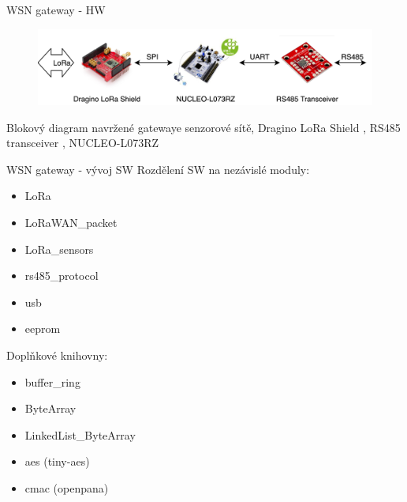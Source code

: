 \documentclass{beamer}
\begin{document}
\begin{frame} {WSN gateway - HW}
	\begin{figure}[!h]
		\centering
		\includegraphics[width=1\textwidth]{LoRaWAN_gw_RS485_blockDiagram_3}
		\label{fig:gatewayBlockDiagram}
	\end{figure}

	Blokový diagram navržené gatewaye senzorové sítě, Dragino LoRa Shield \cite{draginoWiki}, RS485 transceiver \cite{rs485tr}, NUCLEO-L073RZ \cite{nucleo-l073RZ_ST}

\end{frame}

\begin{frame} {WSN gateway - vývoj SW}
		Rozdělení SW na nezávislé moduly:
		\begin{itemize}
			\item LoRa
			\item LoRaWAN\_packet
			\item LoRa\_sensors
			\item rs485\_protocol
			\item usb
			\item eeprom
		\end{itemize}

		Doplňkové knihovny:
		\begin{itemize}
			\item buffer\_ring
			\item ByteArray
			\item LinkedList\_ByteArray
			\item aes (tiny-aes) \cite{lib_tiny-AES128-C} 
			\item cmac (openpana) \cite{lib_openpana}
		\end{itemize}
\end{frame}
\end{document}

